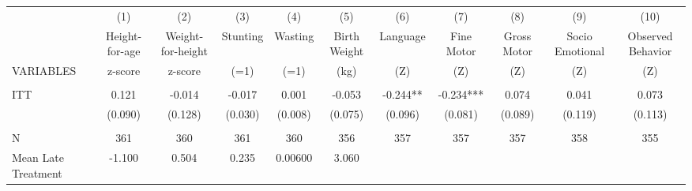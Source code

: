 \begin{tabular}{lcccccccccc} \hline
 & (1) & (2) & (3) & (4) & (5) & (6) & (7) & (8) & (9) & (10) \\
 & Height-for-age & Weight-for-height & Stunting & Wasting & Birth Weight & Language & Fine Motor & Gross Motor & Socio Emotional & Observed Behavior \\
VARIABLES & z-score & z-score & (=1) & (=1) & (kg) & (Z) & (Z) & (Z) & (Z) & (Z) \\ \hline
 &  &  &  &  &  &  &  &  &  &  \\
ITT & 0.121 & -0.014 & -0.017 & 0.001 & -0.053 & -0.244** & -0.234*** & 0.074 & 0.041 & 0.073 \\
 & (0.090) & (0.128) & (0.030) & (0.008) & (0.075) & (0.096) & (0.081) & (0.089) & (0.119) & (0.113) \\
 &  &  &  &  &  &  &  &  &  &  \\
N & 361 & 360 & 361 & 360 & 356 & 357 & 357 & 357 & 358 & 355 \\
 Mean Late Treatment & -1.100 & 0.504 & 0.235 & 0.00600 & 3.060 &  &  &  &  &  \\ \hline
\end{tabular}
